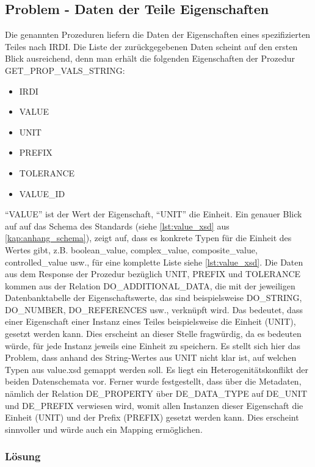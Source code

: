 \subsection{Problem - Daten der Teile Eigenschaften}

Die genannten Prozeduren liefern die Daten der Eigenschaften eines spezifizierten Teiles nach IRDI. Die Liste der zurückgegebenen Daten scheint auf den ersten Blick ausreichend, denn man erhält die folgenden Eigenschaften der Prozedur GET\_PROP\_VALS\_STRING:
\begin{itemize}
  \item IRDI
  \item VALUE
  \item UNIT
  \item PREFIX
  \item TOLERANCE
  \item VALUE\_ID
\end{itemize}

\enquote{VALUE} ist der Wert der Eigenschaft, \enquote{UNIT} die Einheit. Ein genauer Blick auf auf das Schema des Standards (siehe \autoref{lst:value_xsd} aus \autoref{kap:anhang_schema}), zeigt auf, dass es konkrete Typen für die Einheit des Wertes gibt, z.B. boolean\_value, complex\_value, composite\_value, controlled\_value usw., für eine komplette Liste siehe \autoref{lst:value_xsd}. 
Die Daten aus dem Response der Prozedur bezüglich UNIT, PREFIX und TOLERANCE kommen aus der Relation DO\_ADDITIONAL\_DATA, die mit der jeweiligen Datenbanktabelle der Eigenschaftswerte, das sind beispielsweise DO\_STRING, DO\_NUMBER, DO\_REFERENCES usw., verknüpft wird. Das bedeutet, dass einer Eigenschaft einer Instanz eines Teiles beispielsweise die Einheit (UNIT), gesetzt werden kann. Dies erscheint an dieser Stelle fragwürdig, da es bedeuten würde, für jede Instanz jeweils eine Einheit zu speichern. 
Es stellt sich hier das Problem, dass anhand des String-Wertes aus UNIT nicht klar ist, auf welchen Typen aus value.xsd gemappt werden soll. Es liegt ein Heterogenitätskonflikt der beiden Datenschemata vor.  
Ferner wurde festgestellt, dass über die Metadaten, nämlich der Relation DE\_PROPERTY über DE\_DATA\_TYPE auf DE\_UNIT und DE\_PREFIX verwiesen wird, womit allen Instanzen dieser Eigenschaft die Einheit (UNIT) und der Prefix (PREFIX) gesetzt werden kann. Dies erscheint sinnvoller und würde auch ein Mapping ermöglichen. 

\subsubsection{Lösung}

